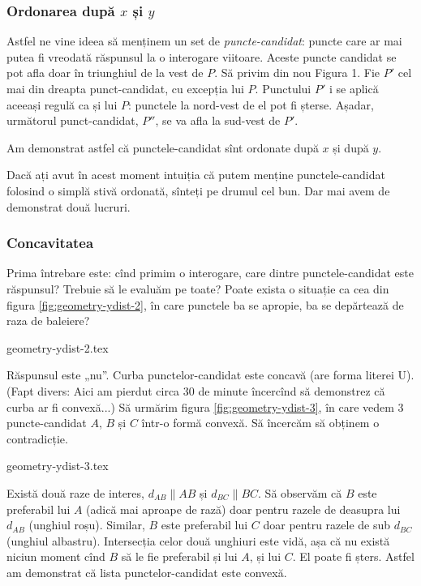 \documentclass[../main.tex]{subfiles}
\begin{document}
\subsubsection*{Ordonarea după $x$ și $y$}

Astfel ne vine ideea să menținem un set de \textit{puncte-candidat}: puncte care ar mai putea fi vreodată răspunsul la o interogare viitoare. Aceste puncte candidat se pot afla doar în triunghiul de la vest de $P$. Să privim din nou Figura 1. Fie $P'$ cel mai din dreapta punct-candidat, cu excepția lui $P$. Punctului $P'$ i se aplică aceeași regulă ca și lui $P$: punctele la nord-vest de el pot fi șterse. Așadar, următorul punct-candidat, $P''$, se va afla la sud-vest de $P'$.

Am demonstrat astfel că punctele-candidat sînt ordonate după $x$ și după $y$.

Dacă ați avut în acest moment intuiția că putem menține punctele-candidat folosind o simplă stivă ordonată, sînteți pe drumul cel bun. Dar mai avem de demonstrat două  lucruri.

\subsubsection*{Concavitatea}

Prima întrebare este: cînd primim o interogare, care dintre punctele-candidat este răspunsul? Trebuie să le evaluăm pe toate? Poate exista o situație ca cea din figura \ref{fig:geometry-ydist-2}, în care punctele ba se apropie, ba se depărtează de raza de baleiere?

{geometry-ydist-2.tex}

Răspunsul este „nu”. Curba punctelor-candidat este concavă (are forma literei U). (Fapt divers: Aici am pierdut circa 30 de minute încercînd să demonstrez că curba ar fi convexă...) Să urmărim figura \ref{fig:geometry-ydist-3}, în care vedem 3 puncte-candidat $A$, $B$ și $C$ într-o formă convexă. Să încercăm să obținem o contradicție.

{geometry-ydist-3.tex}

Există două raze de interes, $d_{AB} \parallel AB$ și $d_{BC} \parallel BC$. Să observăm că $B$ este preferabil lui $A$ (adică mai aproape de rază) doar pentru razele de deasupra lui $d_{AB}$ (unghiul roșu).  Similar, $B$ este preferabil lui $C$ doar pentru razele de sub $d_{BC}$ (unghiul albastru). Intersecția celor două unghiuri este vidă, așa că nu există niciun moment cînd $B$ să le fie preferabil și lui $A$, și lui $C$. El poate fi șters. Astfel am demonstrat că lista punctelor-candidat este convexă.
\end{document}
